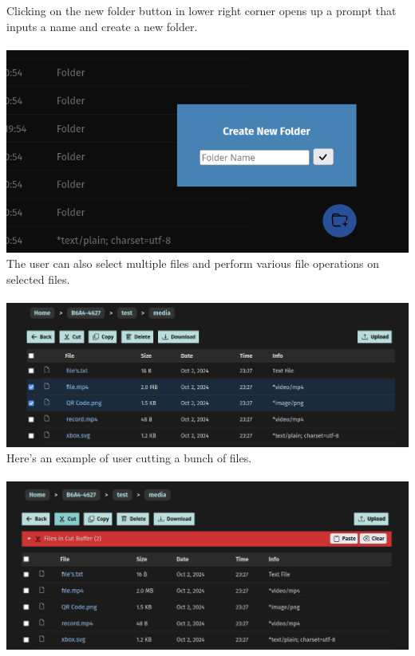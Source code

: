 \documentclass[12pt]{article}
\begin{document}
Clicking on the new folder button in lower right corner opens up a prompt that inputs a name and create a new folder. \\ \\
\includegraphics[width=\linewidth]{ss/4.cm-create-folder.png} \\

\clearpage
The user can also select multiple files and perform various file operations on selected files. \\ \\
\includegraphics[width=\linewidth]{ss/5.cm-select.png} \\

Here's an example of user cutting a bunch of files. \\ \\
\includegraphics[width=\linewidth]{ss/6.cm-cut.png} \\
\end{document}
